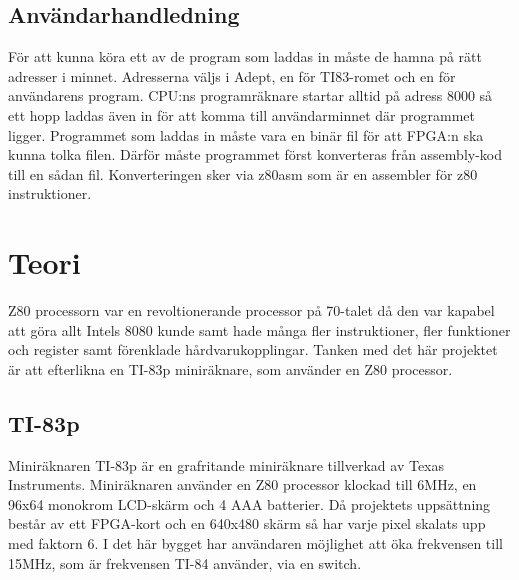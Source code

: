 \documentclass{article}
\begin{document}
\subsection{Användarhandledning}
För att kunna köra ett av de program som laddas in måste de hamna på rätt
adresser i minnet. Adresserna väljs i Adept, en för TI83-romet och en för
användarens program. CPU:ns programräknare startar alltid på adress 8000 så ett
hopp laddas även in för att komma till användarminnet där programmet ligger.
Programmet som laddas in måste vara en binär fil för att FPGA:n ska kunna tolka
filen. Därför måste programmet först konverteras från assembly-kod till en
sådan fil. Konverteringen sker via z80asm som är en assembler för z80
instruktioner.

\clearpage
\section{Teori}
Z80 processorn var en revoltionerande processor på 70-talet då den var kapabel
att göra allt Intels 8080 kunde samt hade många fler instruktioner, fler
funktioner och register samt förenklade hårdvarukopplingar. Tanken med det här
projektet är att efterlikna en TI-83p miniräknare, som använder en Z80
processor.
\subsection{TI-83p}
Miniräknaren TI-83p är en grafritande miniräknare tillverkad av Texas
Instruments. Miniräknaren använder en Z80 processor klockad till 6MHz, en 96x64
monokrom LCD-skärm och 4 AAA batterier. Då projektets uppsättning består av ett
FPGA-kort och en 640x480 skärm så har varje pixel skalats upp med faktorn 6. I
det här bygget har användaren möjlighet att öka frekvensen till 15MHz, som är
frekvensen TI-84 använder, via en switch.
\end{document}

